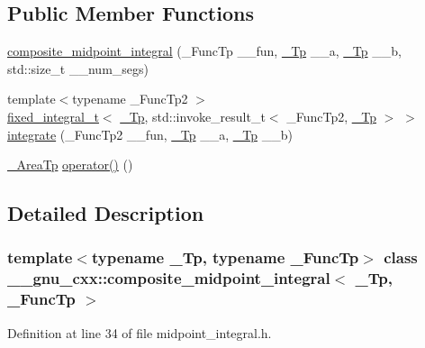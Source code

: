 \subsection*{Public Member Functions}
\begin{DoxyCompactItemize}
\item 
\hyperlink{class____gnu__cxx_1_1composite__midpoint__integral_a298a54b9f6c71969b28f8b7216d0a78a}{composite\+\_\+midpoint\+\_\+integral} (\+\_\+\+Func\+Tp \+\_\+\+\_\+fun, \hyperlink{namespace____gnu__cxx_a3b19a9c800ca194374ef9172290f7d79}{\+\_\+\+Tp} \+\_\+\+\_\+a, \hyperlink{namespace____gnu__cxx_a3b19a9c800ca194374ef9172290f7d79}{\+\_\+\+Tp} \+\_\+\+\_\+b, std\+::size\+\_\+t \+\_\+\+\_\+num\+\_\+segs)
\item 
{\footnotesize template$<$typename \+\_\+\+Func\+Tp2 $>$ }\\\hyperlink{struct____gnu__cxx_1_1fixed__integral__t}{fixed\+\_\+integral\+\_\+t}$<$ \hyperlink{namespace____gnu__cxx_a3b19a9c800ca194374ef9172290f7d79}{\+\_\+\+Tp}, std\+::invoke\+\_\+result\+\_\+t$<$ \+\_\+\+Func\+Tp2, \hyperlink{namespace____gnu__cxx_a3b19a9c800ca194374ef9172290f7d79}{\+\_\+\+Tp} $>$ $>$ \hyperlink{class____gnu__cxx_1_1composite__midpoint__integral_a7eb1aeb6fba86c8c4dce818b83af4d2d}{integrate} (\+\_\+\+Func\+Tp2 \+\_\+\+\_\+fun, \hyperlink{namespace____gnu__cxx_a3b19a9c800ca194374ef9172290f7d79}{\+\_\+\+Tp} \+\_\+\+\_\+a, \hyperlink{namespace____gnu__cxx_a3b19a9c800ca194374ef9172290f7d79}{\+\_\+\+Tp} \+\_\+\+\_\+b)
\item 
\hyperlink{class____gnu__cxx_1_1composite__midpoint__integral_a02175286c06db2fab6f727eab5117b25}{\+\_\+\+Area\+Tp} \hyperlink{class____gnu__cxx_1_1composite__midpoint__integral_a28788cf79367faecd19fb307925223d0}{operator()} ()
\end{DoxyCompactItemize}


\subsection{Detailed Description}
\subsubsection*{template$<$typename \+\_\+\+Tp, typename \+\_\+\+Func\+Tp$>$\newline
class \+\_\+\+\_\+gnu\+\_\+cxx\+::composite\+\_\+midpoint\+\_\+integral$<$ \+\_\+\+Tp, \+\_\+\+Func\+Tp $>$}



Definition at line 34 of file midpoint\+\_\+integral.\+h.



